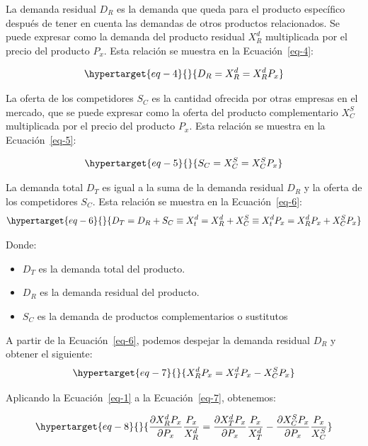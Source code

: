 \documentclass[
  a4paper,
]{article}
\providecommand{\tightlist}{%
  \setlength{\itemsep}{0pt}\setlength{\parskip}{0pt}}\usepackage{longtable,booktabs,array}
\theoremstyle{definition}
\theoremstyle{remark}
\begin{document}
La demanda residual \(D_R\) es la demanda que queda para el producto
específico después de tener en cuenta las demandas de otros productos
relacionados. Se puede expresar como la demanda del producto residual
\(X_R^d\) multiplicada por el precio del producto \(P_x\). Esta relación
se muestra en la Ecuación~\ref{eq-4}:

\begin{equation}\protect\hypertarget{eq-4}{}{
D_R = X_R^d = X_R^d P_x
}\label{eq-4}\end{equation}

La oferta de los competidores \(S_C\) es la cantidad ofrecida por otras
empresas en el mercado, que se puede expresar como la oferta del
producto complementario \(X_C^S\) multiplicada por el precio del
producto \(P_x\). Esta relación se muestra en la Ecuación~\ref{eq-5}:

\begin{equation}\protect\hypertarget{eq-5}{}{
S_C = X_C^S = X_C^S P_x
}\label{eq-5}\end{equation}

La demanda total \(D_T\) es igual a la suma de la demanda residual
\(D_R\) y la oferta de los competidores \(S_C\). Esta relación se
muestra en la Ecuación~\ref{eq-6}:
\begin{equation}\protect\hypertarget{eq-6}{}{
D_T = D_R + S_C \equiv X_t^d = X_R^d + X_C^S \equiv X_t^d P_x = X_R^d P_x + X_C^S P_x
}\label{eq-6}\end{equation}

Donde:

\begin{itemize}
\tightlist
\item
  \(D_T\) es la demanda total del producto.
\item
  \(D_R\) es la demanda residual del producto.
\item
  \(S_C\) es la demanda de productos complementarios o sustitutos
\end{itemize}

A partir de la Ecuación~\ref{eq-6}, podemos despejar la demanda residual
\(D_R\) y obtener el siguiente:
\begin{equation}\protect\hypertarget{eq-7}{}{
X_R^d P_x = X_T^d P_x - X_C^S P_x
}\label{eq-7}\end{equation}

Aplicando la Ecuación~\ref{eq-1} a la Ecuación~\ref{eq-7}, obtenemos:

\begin{equation}\protect\hypertarget{eq-8}{}{
\frac{\partial X_R^d P_x}{\partial P_x} \frac{P_x}{X_R^d} = \frac{\partial X_T^d P_x}{\partial P_x} \frac{P_x}{X_T^d} - \frac{\partial X_C^S P_x}{\partial P_x} \frac{P_x}{X_C^S}
}\label{eq-8}\end{equation}
\end{document}
